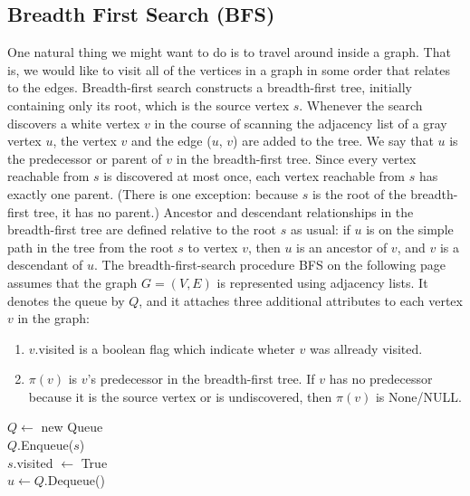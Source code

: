 \subsection{Breadth First Search (BFS)}

One natural thing we might want to do is to travel around inside a graph. That is, we would like to visit all of the vertices in a graph in some order that relates to the edges. 
Breadth-first search constructs a breadth-first tree, initially containing only its root, which is the source vertex $s$. Whenever the search discovers a white vertex $v$ in the course of scanning the adjacency list of a gray vertex $u$, the vertex $v$ and the edge ($u$, $v$) are added to the tree. We say that $u$ is the predecessor or parent of $v$ in the breadth-first tree. Since every vertex reachable from $s$ is discovered at most once, each vertex reachable from $s$ has exactly one parent. (There is one exception: because $s$ is the root of the breadth-first tree, it has no parent.) Ancestor and descendant relationships in the breadth-first tree are defined relative to the root $s$ as usual: if $u$ is on the simple path in the tree from the root $s$ to vertex $v$, then $u$ is an ancestor of $v$, and $v$ is a descendant of $u$.
The breadth-first-search procedure BFS on the following page assumes that the graph $G = (V, E)$ is represented using adjacency lists. It denotes the queue by $Q$, and it attaches three additional attributes to each vertex $v$ in the graph:

\begin{enumerate}
    \item $v$.visited is a boolean flag which indicate wheter $v$ was allready visited.
    \item $\pi(v)$ is $v$’s predecessor in the breadth-first tree. If $v$ has no predecessor because it is the source vertex or is undiscovered, then $\pi(v)$ is None/NULL.
\end{enumerate}


  \begin{algorithm}[H]
 $Q\leftarrow$ new Queue \\ 
 $Q$.Enqueue($s$) \\
 $s$.visited $\leftarrow$ True \\
  {
 $u\leftarrow Q$.Dequeue() \\
	 {
	}
      }
  \end{algorithm}


